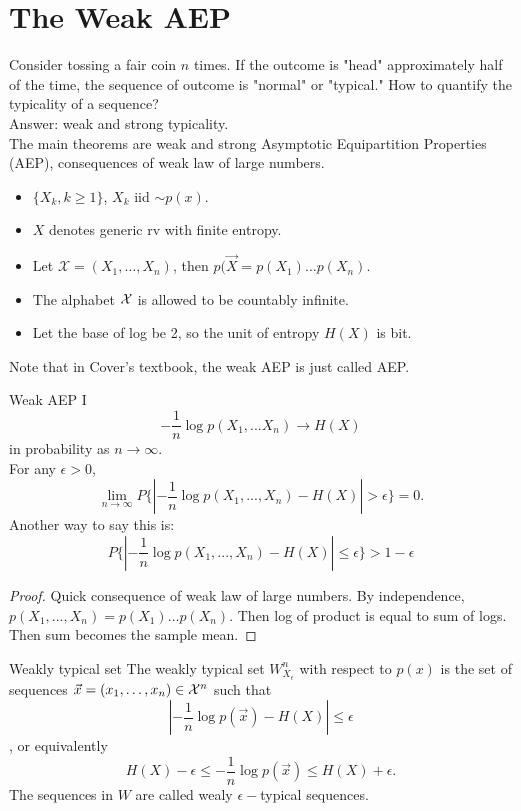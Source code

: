 \documentclass[../main.tex]{subfiles}
\begin{document}
\section{The Weak AEP}
Consider tossing a fair coin $n$ times. If the outcome is "head" approximately half of the time, the sequence of outcome is "normal" or "typical." How to quantify the typicality of a sequence?\\
Answer: weak and strong typicality.\\
The main theorems are weak and strong Asymptotic Equipartition Properties (AEP), consequences of weak law of large numbers.
\begin{itemize}
    \item $\{X_k,k\geq 1\}$, $X_k$ iid $\sim p(x)$.
    \item $X$ denotes generic rv with finite entropy.
    \item Let $\mathcal{X}=(X_1,\dots,X_n)$, then $p(\vec X=p(X_1)\dots p(X_n).$
    \item The alphabet $\mathcal{X}$ is allowed to be countably infinite.
    \item Let the base of log be 2, so the unit of entropy $H(X)$ is  bit.
\end{itemize}
Note that in Cover's textbook, the weak AEP is just called AEP.
\begin{bbox}{Weak AEP I}
    \begin{equation*}
        -\frac{1}{n}\log p(X_1,...X_n)\to H(X)
    \end{equation*} in probability as $n\to\infty$.\\
    For any $\epsilon>0$,\[
    \lim_{n\to\infty}P\{|-\frac{1}{n}\log p(X_1,...,X_n) - H(X)|>\epsilon\}=0.
    \]
    Another way to say this is: \[
    P\{|-\frac{1}{n}\log p(X_1,...,X_n) - H(X)| \leq \epsilon\} > 1-\epsilon
    \]
    \begin{proof} Quick consequence of weak law of large numbers. By independence, $p(X_1,...,X_n)=p(X_1)\dots p(X_n)$. Then log of product is equal to sum of logs. Then sum becomes the sample mean.
    \end{proof}
\end{bbox}
\begin{gbox}{Weakly typical set}
    The weakly typical set $W^n_{X_\epsilon}$ with respect to $p(x)$ is the set of sequences $\vec x=(x_1,\dots,x_n)\in \mathcal{X}^n$ such that \[|-\frac{1}{n}\log p(\vec x)-H(X)| \leq \epsilon\], or equivalently \[
    H(X)-\epsilon \leq -\frac{1}{n}\log p(\vec x)\leq H(X)+\epsilon.
    \]
    The sequences in $W$ are called wealy $\epsilon-$typical sequences. 
\end{gbox}
\end{document}
